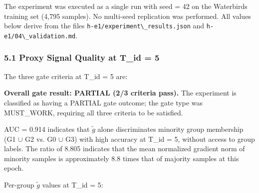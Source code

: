 
The experiment was executed as a single run with seed = 42 on the Waterbirds training set (4,795 samples). No multi-seed replication was performed. All values below derive from the files \texttt{h-e1/experiment\textbackslash \_results.json} and \texttt{h-e1/04\textbackslash \_validation.md}.

\subsubsection{5.1 Proxy Signal Quality at T\_id = 5}

The three gate criteria at T\_id = 5 are:

\begin{table}[htbp]
\centering
{}
\end{table}

\textbf{Overall gate result: PARTIAL (2/3 criteria pass).} The experiment is classified as having a PARTIAL gate outcome; the gate type was MUST\_WORK, requiring all three criteria to be satisfied.

AUC = 0.914 indicates that $\tilde{g}$ alone discriminates minority group membership (G1 $\cup$ G2 vs. G0 $\cup$ G3) with high accuracy at T\_id = 5, without access to group labels. The ratio of 8.805 indicates that the mean normalized gradient norm of minority samples is approximately 8.8 times that of majority samples at this epoch.

Per-group $\tilde{g}$ values at T\_id = 5:

\begin{table}[htbp]
\centering
{}
\end{table}

